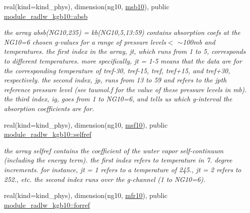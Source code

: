 \begin{DoxyCompactItemize}
\mbox{\label{group__module__radlw__kgbnn_gaf1e2252355a3002080be21ce37d45c3a}} 
real(kind=kind\+\_\+phys), dimension(ng10, \hyperlink{group__module__radlw__kgbnn_gaf33570d793ca152588c14ce30ac30798}{msb10}), public \hyperlink{group__module__radlw__kgbnn_gaf1e2252355a3002080be21ce37d45c3a}{module\+\_\+radlw\+\_\+kgb10\+::absb}
\begin{DoxyCompactList}\small\item\em the array absb(\+N\+G10,235) = kb(\+N\+G10,5,13\+:59) contains absorption coefs at the N\+G10=6 chosen g-\/values for a range of pressure levels$<$ $\sim$100mb and temperatures. the first index in the array, jt, which runs from 1 to 5, corresponds to different temperatures. more specifically, jt = 1-\/5 means that the data are for the corresponding temperature of tref-\/30, tref-\/15, tref, tref+15, and tref+30, respectively. the second index, jp, runs from 13 to 59 and refers to the jpth reference pressure level (see taumol.\+f for the value of these pressure levels in mb). the third index, ig, goes from 1 to N\+G10=6, and tells us which g-\/interval the absorption coefficients are for. \end{DoxyCompactList}\item 
\mbox{\label{group__module__radlw__kgbnn_ga48247dea283a611ebe57dd1c164dda69}} 
real(kind=kind\+\_\+phys), dimension(ng10, \hyperlink{group__module__radlw__kgbnn_ga1b69c6fe99ed4ebc7b3d78b8f842b880}{msf10}), public \hyperlink{group__module__radlw__kgbnn_ga48247dea283a611ebe57dd1c164dda69}{module\+\_\+radlw\+\_\+kgb10\+::selfref}
\begin{DoxyCompactList}\small\item\em the array selfref contains the coefficient of the water vapor self-\/continuum (including the energy term). the first index refers to temperature in 7. degree increments. for instance, jt = 1 refers to a temperature of 245., jt = 2 refers to 252., etc. the second index runs over the g-\/channel (1 to N\+G10=6). \end{DoxyCompactList}\item 
\mbox{\label{group__module__radlw__kgbnn_gaf70e39048d571053790289549dd8333a}} 
real(kind=kind\+\_\+phys), dimension(ng10, \hyperlink{group__module__radlw__kgbnn_ga0f3944c4b86044e0c5db3dc351226c88}{mfr10}), public \hyperlink{group__module__radlw__kgbnn_gaf70e39048d571053790289549dd8333a}{module\+\_\+radlw\+\_\+kgb10\+::forref}

\end{DoxyCompactItemize}
